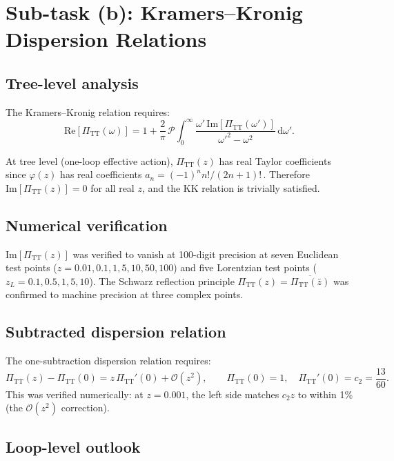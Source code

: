 \documentclass[11pt,a4paper]{article}
\newcommand{\dd}{\mathrm{d}}
\newcommand{\PiTT}{\Pi_{\mathrm{TT}}}
\newcommand{\order}{\mathcal{O}}
\newcommand{\Imag}{\mathrm{Im}}
\newcommand{\Real}{\mathrm{Re}}
\begin{document}
\section{Sub-task (b): Kramers--Kronig Dispersion Relations}
\label{sec:KK}

\subsection{Tree-level analysis}

The Kramers--Kronig relation requires:
\begin{equation}\label{eq:KK}
  \Real[\PiTT(\omega)] = 1 + \frac{2}{\pi}\,\mathcal{P}\!\int_0^\infty
  \frac{\omega'\,\Imag[\PiTT(\omega')]}{\omega'^2 - \omega^2}\,\dd\omega'.
\end{equation}

At tree level (one-loop effective action), $\PiTT(z)$ has real Taylor coefficients
since $\varphi(z)$ has real coefficients $a_n = (-1)^n n!/(2n+1)!$\,.
Therefore $\Imag[\PiTT(z)] = 0$ for all real $z$, and the KK relation is
trivially satisfied.

\subsection{Numerical verification}

$\Imag[\PiTT(z)]$ was verified to vanish at 100-digit precision at seven
Euclidean test points ($z = 0.01, 0.1, 1, 5, 10, 50, 100$) and five Lorentzian
test points ($z_L = 0.1, 0.5, 1, 5, 10$). The Schwarz reflection principle
$\PiTT(z) = \overline{\PiTT(\bar{z})}$ was confirmed to machine precision at
three complex points.

\subsection{Subtracted dispersion relation}

The one-subtraction dispersion relation requires:
\begin{equation}
  \PiTT(z) - \PiTT(0) = z\,\PiTT'(0) + \order(z^2),
  \qquad \PiTT(0) = 1,\quad \PiTT'(0) = c_2 = \frac{13}{60}.
\end{equation}
This was verified numerically: at $z = 0.001$, the left side matches $c_2 z$
to within 1\% (the $\order(z^2)$ correction).

\subsection{Loop-level outlook}
\end{document}
